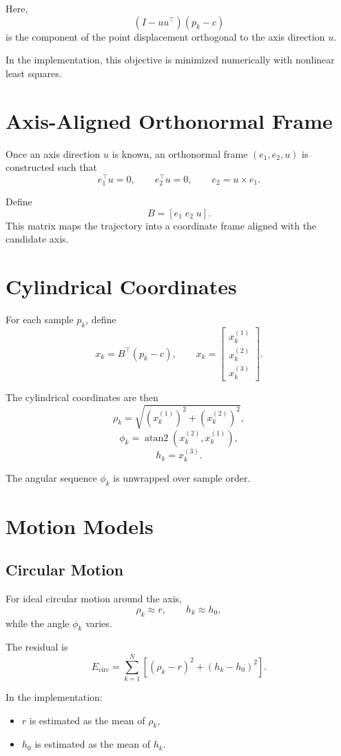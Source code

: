 \documentclass[11pt]{article}
\begin{document}
Here,
\[
(I - uu^\top)(p_k - c)
\]
is the component of the point displacement orthogonal to the axis direction $u$.

In the implementation, this objective is minimized numerically with nonlinear least squares.

\section{Axis-Aligned Orthonormal Frame}

Once an axis direction $u$ is known, an orthonormal frame $(e_1,e_2,u)$ is constructed such that
\[
e_1^\top u = 0, \qquad e_2^\top u = 0, \qquad e_2 = u \times e_1.
\]

Define
\[
B = [e_1 \; e_2 \; u].
\]
This matrix maps the trajectory into a coordinate frame aligned with the candidate axis.

\section{Cylindrical Coordinates}

For each sample $p_k$, define
\[
x_k = B^\top (p_k - c),
\qquad
x_k =
\begin{bmatrix}
x_k^{(1)} \\
x_k^{(2)} \\
x_k^{(3)}
\end{bmatrix}.
\]

The cylindrical coordinates are then
\[
\rho_k = \sqrt{(x_k^{(1)})^2 + (x_k^{(2)})^2},
\]
\[
\phi_k = \operatorname{atan2}\left(x_k^{(2)}, x_k^{(1)}\right),
\]
\[
h_k = x_k^{(3)}.
\]

The angular sequence $\phi_k$ is unwrapped over sample order.

\section{Motion Models}

\subsection{Circular Motion}

For ideal circular motion around the axis,
\[
\rho_k \approx r, \qquad h_k \approx h_0,
\]
while the angle $\phi_k$ varies.

The residual is
\[
E_{\mathrm{circ}}
=
\sum_{k=1}^{N}
\left[
(\rho_k - r)^2 + (h_k - h_0)^2
\right].
\]

In the implementation:
\begin{itemize}
    \item $r$ is estimated as the mean of $\rho_k$,
    \item $h_0$ is estimated as the mean of $h_k$.
\end{itemize}
\end{document}
